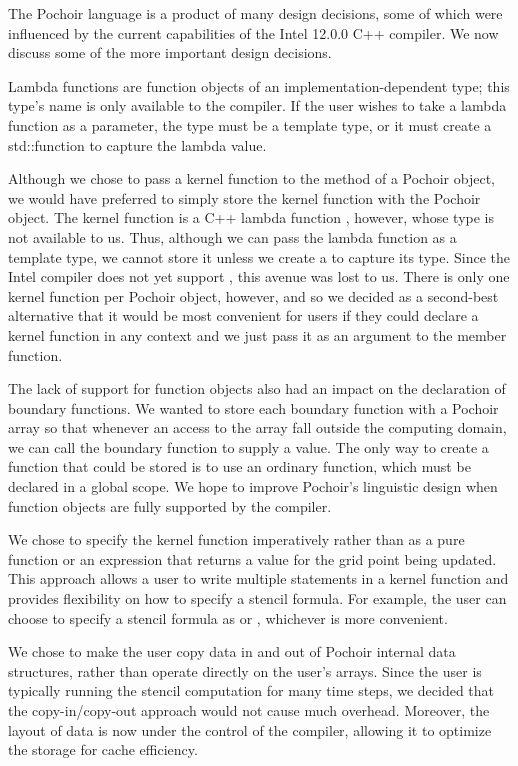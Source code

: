 
The Pochoir language is a product of many design decisions, some of
which were influenced by the current capabilities of the Intel 12.0.0
C++ compiler.  We now discuss some of the more important design
decisions.

Lambda functions are function objects of an implementation-dependent
type; this type's name is only available to the compiler. If the user
wishes to take a lambda function as a parameter, the type must be a
template type, or it must create a std::function to capture the lambda
value.

Although we chose to pass a kernel function to the  method
of a Pochoir object, we would have preferred to simply store the
kernel function with the Pochoir object.  The kernel function is a C++
lambda function \cite{ISOIEC11}, however, whose type is not available to us.
Thus, although we can pass the lambda function as a template type, we
cannot store it unless we create a  to capture its
type.  Since the Intel compiler does not yet support
, this avenue was lost to us.  There is only one
kernel function per Pochoir object, however, and so we decided as a
second-best alternative that it would be most convenient for users if
they could declare a kernel function in any context and we just pass
it as an argument to the  member function.

The lack of support for function objects also had an impact on the
declaration of boundary functions.  We wanted to store each boundary
function with a Pochoir array so that whenever an access to the array
fall outside the computing domain, we can call the boundary function
to supply a value.  The only way to create a function that could be
stored is to use an ordinary function, which must be declared in a
global scope.  We hope to improve Pochoir's linguistic design when
function objects are fully supported by the compiler.

We chose to specify the kernel function imperatively rather than as a
pure function or an expression that returns a value for the grid point
being updated.  This approach allows a user to write multiple
statements in a kernel function and provides flexibility on how to
specify a stencil formula.  For example, the user can choose to
specify a stencil formula as
%
 or
%
, whichever is more convenient.

We chose to make the user copy data in and out of Pochoir internal
data structures, rather than operate directly on the user's arrays.
Since the user is typically running the stencil computation for many
time steps, we decided that the copy-in/copy-out approach would not
cause much overhead.  Moreover, the layout of data is now under the
control of the compiler, allowing it to optimize the storage for cache
efficiency.

